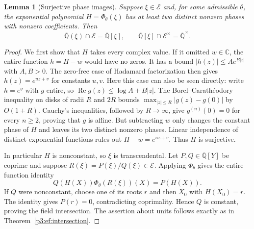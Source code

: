 \documentclass[11pt,a4paper]{article}
\newtheorem{lemma}[theorem]{Lemma}
\theoremstyle{definition}
\theoremstyle{remark}
\numberwithin{equation}{section}
\begin{document}
\begin{lemma}[Surjective phase images]
\label{p3:ef:surjective-phase}
Suppose $\xi\in\mathcal E$ and, for some admissible $\theta$, the
exponential polynomial $H=\Phi_\theta(\xi)$ has at least two distinct
nonzero phases with nonzero coefficients.  Then
\begin{equation}\label{p3:ef:surjective-intersection}
 \overline{\mathbb Q}(\xi)\cap\mathcal E
 =\overline{\mathbb Q}[\xi],\qquad
 \overline{\mathbb Q}[\xi]\cap\mathcal E^\times
 =\overline{\mathbb Q}^\times.
\end{equation}
\end{lemma}
\begin{proof}
We first show that $H$ takes every complex value.  If it omitted
$w\in\mathbb C$, the entire function $h=H-w$ would have no zeros.
It has a bound $|h(z)|\le A e^{B|z|}$ with $A,B>0$.
The zero-free case of Hadamard factorization then gives
$h(z)=e^{uz+v}$ for constants $u,v$.
Here this case can also be seen directly: write $h=e^g$ with $g$
entire, so $\operatorname{Re}g(z)\le\log A+B|z|$.
The Borel--Carath\'eodory inequality on disks of radii $R$ and $2R$
bounds $\max_{|z|\le R}|g(z)-g(0)|$ by $O(1+R)$.
Cauchy's inequalities, followed by $R\to\infty$, give
$g^{(n)}(0)=0$ for every $n\ge2$, proving that $g$ is affine.
But subtracting $w$ only changes the constant phase of $H$ and leaves
its two distinct nonzero phases.  Linear independence of distinct
exponential functions rules out $H-w=e^{uz+v}$.  Thus $H$ is surjective.

In particular $H$ is nonconstant, so $\xi$ is transcendental.
Let $P,Q\in\overline{\mathbb Q}[Y]$ be coprime and suppose
$R(\xi)=P(\xi)/Q(\xi)\in\mathcal E$.
Applying $\Phi_\theta$ gives the entire-function identity
\[
 Q(H(X))\Phi_\theta(R(\xi))(X)=P(H(X)).
\]
If $Q$ were nonconstant, choose one of its roots $r$ and then $X_0$
with $H(X_0)=r$.  The identity gives $P(r)=0$, contradicting
coprimality.  Hence $Q$ is constant, proving the field intersection.
The assertion about units follows exactly as in
Theorem~\ref{p3:ef:intersection}.
\end{proof}
\end{document}
